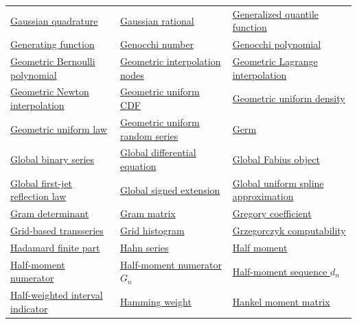 \documentclass[11pt,oneside]{article}
\begin{document}
\begin{longtable}{L{0.31\textwidth}L{0.31\textwidth}L{0.31\textwidth}}
\hyperlink{gls:gaussian-quadrature}{Gaussian quadrature} & \hyperlink{gls:gaussian-rational}{Gaussian rational} & \hyperlink{gls:generalized-quantile-function}{Generalized quantile function} \\
\hyperlink{gls:generating-function}{Generating function} & \hyperlink{gls:genocchi-number}{Genocchi number} & \hyperlink{gls:genocchi-polynomial}{Genocchi polynomial} \\
\hyperlink{gls:geometric-bernoulli-polynomial}{Geometric Bernoulli polynomial} & \hyperlink{gls:geometric-interpolation-nodes}{Geometric interpolation nodes} & \hyperlink{gls:geometric-lagrange-interpolation}{Geometric Lagrange interpolation} \\
\hyperlink{gls:geometric-newton-interpolation}{Geometric Newton interpolation} & \hyperlink{gls:geometric-uniform-cdf}{Geometric uniform CDF} & \hyperlink{gls:geometric-uniform-density}{Geometric uniform density} \\
\hyperlink{gls:geometric-uniform-law}{Geometric uniform law} & \hyperlink{gls:geometric-uniform-random-series}{Geometric uniform random series} & \hyperlink{gls:germ}{Germ} \\
\hyperlink{gls:global-binary-series}{Global binary series} & \hyperlink{gls:global-differential-equation}{Global differential equation} & \hyperlink{gls:global-fabius-object}{Global Fabius object} \\
\hyperlink{gls:global-first-jet-reflection-law}{Global first-jet reflection law} & \hyperlink{gls:global-signed-extension}{Global signed extension} & \hyperlink{gls:global-uniform-spline-approximation}{Global uniform spline approximation} \\
\hyperlink{gls:gram-determinant}{Gram determinant} & \hyperlink{gls:gram-matrix}{Gram matrix} & \hyperlink{gls:gregory-coefficient}{Gregory coefficient} \\
\hyperlink{gls:grid-based-transseries}{Grid-based transseries} & \hyperlink{gls:grid-histogram}{Grid histogram} & \hyperlink{gls:grzegorczyk-computability}{Grzegorczyk computability} \\
\hyperlink{gls:hadamard-finite-part}{Hadamard finite part} & \hyperlink{gls:hahn-series}{Hahn series} & \hyperlink{gls:half-moment}{Half moment} \\
\hyperlink{gls:half-moment-numerator}{Half-moment numerator} & \hyperlink{gls:half-moment-numerator-g}{Half-moment numerator $G_n$} & \hyperlink{gls:half-moment-sequence-d}{Half-moment sequence $d_n$} \\
\hyperlink{gls:half-weighted-interval-indicator}{Half-weighted interval indicator} & \hyperlink{gls:hamming-weight}{Hamming weight} & \hyperlink{gls:hankel-moment-matrix}{Hankel moment matrix} \\

\end{longtable}
\end{document}
